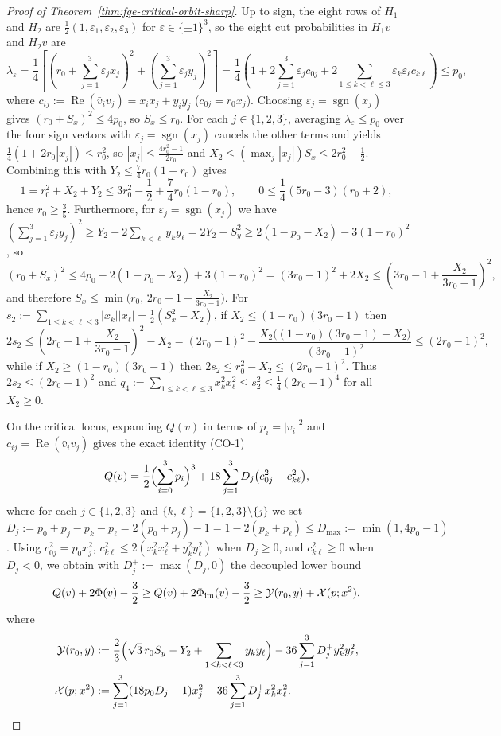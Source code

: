 \begin{proof}[Proof of Theorem~\ref{thm:fqe-critical-orbit-sharp}]
Up to sign, the eight rows of $H_1$ and $H_2$ are
$\tfrac12(1,\varepsilon_1,\varepsilon_2,\varepsilon_3)$ for
$\varepsilon\in\{\pm1\}^3$, so the eight cut probabilities in $H_1v$ and
$H_2v$ are
\[
 \lambda_\varepsilon
 =\frac14\left[\left(r_0+\sum_{j=1}^3\varepsilon_jx_j\right)^2
   +\left(\sum_{j=1}^3\varepsilon_jy_j\right)^2\right]
 =\frac14\left(1+2\sum_{j=1}^3\varepsilon_jc_{0j}
   +2\sum_{1\le k<\ell\le3}\varepsilon_k\varepsilon_\ell c_{k\ell}\right)\le p_0,
\]
where $c_{ij}:=\operatorname{Re}(\bar v_iv_j)=x_ix_j+y_iy_j$
($c_{0j}=r_0x_j$). Choosing $\varepsilon_j=\operatorname{sgn}(x_j)$ gives
$(r_0+S_x)^2\le4p_0$, so $S_x\le r_0$. For each $j\in\{1,2,3\}$, averaging
$\lambda_\varepsilon\le p_0$ over the four sign vectors with
$\varepsilon_j=\operatorname{sgn}(x_j)$ cancels the other terms and yields
$\tfrac14(1+2r_0|x_j|)\le r_0^2$, so $|x_j|\le\frac{4r_0^2-1}{2r_0}$ and
$X_2\le(\max_j|x_j|)S_x\le2r_0^2-\tfrac12$. Combining this with
$Y_2\le\tfrac74r_0(1-r_0)$ gives
\[
 1=r_0^2+X_2+Y_2\le3r_0^2-\frac12+\frac74r_0(1-r_0),\qquad
 0\le\frac14(5r_0-3)(r_0+2),
\]
hence $r_0\ge\tfrac35$. Furthermore, for $\varepsilon_j=\operatorname{sgn}(x_j)$
we have $(\sum_{j=1}^3\varepsilon_jy_j)^2\ge Y_2-2\sum_{k<\ell}y_ky_\ell
=2Y_2-S_y^2\ge2(1-p_0-X_2)-3(1-r_0)^2$, so
\[
 (r_0+S_x)^2\le4p_0-2(1-p_0-X_2)+3(1-r_0)^2=(3r_0-1)^2+2X_2
 \le\left(3r_0-1+\frac{X_2}{3r_0-1}\right)^2,
\]
and therefore $S_x\le\min\bigl(r_0,\,2r_0-1+\frac{X_2}{3r_0-1}\bigr)$. For
$s_2:=\sum_{1\le k<\ell\le3}|x_k||x_\ell|=\tfrac12(S_x^2-X_2)$, if
$X_2\le(1-r_0)(3r_0-1)$ then
\[
 2s_2\le\left(2r_0-1+\frac{X_2}{3r_0-1}\right)^2-X_2
 =(2r_0-1)^2-\frac{X_2\bigl((1-r_0)(3r_0-1)-X_2\bigr)}{(3r_0-1)^2}
 \le(2r_0-1)^2,
\]
while if $X_2\ge(1-r_0)(3r_0-1)$ then
$2s_2\le r_0^2-X_2\le(2r_0-1)^2$. Thus $2s_2\le(2r_0-1)^2$ and
$q_4:=\sum_{1\le k<\ell\le3}x_k^2x_\ell^2\le s_2^2\le\tfrac14(2r_0-1)^4$
for all $X_2\ge0$.

On the critical locus, expanding $Q(v)$ in terms of $p_i=|v_i|^2$ and
$c_{ij}=\operatorname{Re}(\bar v_iv_j)$ gives the exact identity (CO-1)
\begin{equation}\label{eq:fqe-critical-three-term}
 Q(v)=\frac12\Bigl(\sum_{i=0}^3p_i\Bigr)^3
      +18\sum_{j=1}^3D_j\bigl(c_{0j}^2-c_{k\ell}^2\bigr),
\end{equation}
where for each $j\in\{1,2,3\}$ and $\{k,\ell\}=\{1,2,3\}\setminus\{j\}$ we
set $D_j:=p_0+p_j-p_k-p_\ell=2(p_0+p_j)-1=1-2(p_k+p_\ell)\le
D_{\max}:=\min(1,4p_0-1)$. Using $c_{0j}^2=p_0x_j^2$,
$c_{k\ell}^2\le2(x_k^2x_\ell^2+y_k^2y_\ell^2)$ when $D_j\ge0$, and
$c_{k\ell}^2\ge0$ when $D_j<0$, we obtain with $D_j^+:=\max(D_j,0)$ the
decoupled lower bound
\[
 Q(v)+2\Phi(v)-\frac32\ge Q(v)+2\Phi_{\rm im}(v)-\frac32
 \ge\mathcal Y(r_0,y)+\mathcal X(p;x^2),
\]
where
\begin{align*}
 \mathcal Y(r_0,y)&:=\frac23\Bigl(\sqrt3\,r_0S_y-Y_2
   +\sum_{1\le k<\ell\le3}y_ky_\ell\Bigr)-36\sum_{j=1}^3D_j^+y_k^2y_\ell^2,\\
 \mathcal X(p;x^2)&:=\sum_{j=1}^3(18p_0D_j-1)x_j^2
   -36\sum_{j=1}^3D_j^+x_k^2x_\ell^2.
\end{align*}


\end{proof}
